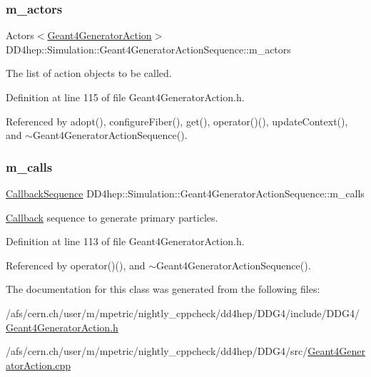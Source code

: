 \subsubsection{\texorpdfstring{m\+\_\+actors}{m\_actors}}
{\footnotesize\ttfamily Actors$<$\hyperlink{class_d_d4hep_1_1_simulation_1_1_geant4_generator_action}{Geant4\+Generator\+Action}$>$ D\+D4hep\+::\+Simulation\+::\+Geant4\+Generator\+Action\+Sequence\+::m\+\_\+actors\hspace{0.3cm}{\ttfamily [protected]}}



The list of action objects to be called. 



Definition at line 115 of file Geant4\+Generator\+Action.\+h.



Referenced by adopt(), configure\+Fiber(), get(), operator()(), update\+Context(), and $\sim$\+Geant4\+Generator\+Action\+Sequence().

\hypertarget{class_d_d4hep_1_1_simulation_1_1_geant4_generator_action_sequence_a3861258f355c58bb19602e7d099c1c9e}{}\label{class_d_d4hep_1_1_simulation_1_1_geant4_generator_action_sequence_a3861258f355c58bb19602e7d099c1c9e} 
\subsubsection{\texorpdfstring{m\+\_\+calls}{m\_calls}}
{\footnotesize\ttfamily \hyperlink{struct_d_d4hep_1_1_callback_sequence}{Callback\+Sequence} D\+D4hep\+::\+Simulation\+::\+Geant4\+Generator\+Action\+Sequence\+::m\+\_\+calls\hspace{0.3cm}{\ttfamily [protected]}}



\hyperlink{class_d_d4hep_1_1_callback}{Callback} sequence to generate primary particles. 



Definition at line 113 of file Geant4\+Generator\+Action.\+h.



Referenced by operator()(), and $\sim$\+Geant4\+Generator\+Action\+Sequence().



The documentation for this class was generated from the following files\+:\begin{DoxyCompactItemize}
\item 
/afs/cern.\+ch/user/m/mpetric/nightly\+\_\+cppcheck/dd4hep/\+D\+D\+G4/include/\+D\+D\+G4/\hyperlink{_geant4_generator_action_8h}{Geant4\+Generator\+Action.\+h}\item 
/afs/cern.\+ch/user/m/mpetric/nightly\+\_\+cppcheck/dd4hep/\+D\+D\+G4/src/\hyperlink{_geant4_generator_action_8cpp}{Geant4\+Generator\+Action.\+cpp}\end{DoxyCompactItemize}
